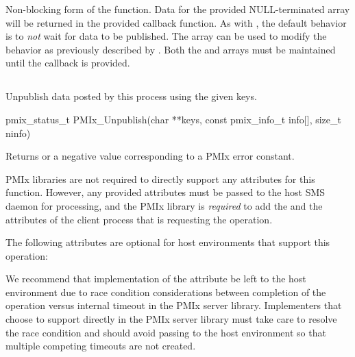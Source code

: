 Non-blocking form of the  function.
Data for the provided NULL-terminated  array will be returned in the provided callback function.
As with , the default behavior is to \emph{not} wait for data to be published.
The  array can be used to modify the behavior as previously described by . Both the  and  arrays must be maintained until the callback is provided.



\subsection{}

\summary

Unpublish data posted by this process using the given keys.

\format

\cspecificstart
\begin{codepar}
pmix_status_t
PMIx_Unpublish(char **keys,
               const pmix_info_t info[], size_t ninfo)
\end{codepar}
\cspecificend

\begin{arglist}
\end{arglist}

Returns  or a negative value corresponding to a PMIx error constant.

\reqattrstart
\ac{PMIx} libraries are not required to directly support any attributes for this function. However, any provided attributes must be passed to the host \ac{SMS} daemon for processing, and the \ac{PMIx} library is \textit{required} to add the  and the  attributes of the client process that is requesting the operation.

\reqattrend

\optattrstart
The following attributes are optional for host environments that support this operation:


\optattrend

\adviceimplstart
We recommend that implementation of the  attribute be left to the host environment due to race condition considerations between completion of the operation versus internal timeout in the \ac{PMIx} server library. Implementers that choose to support  directly in the \ac{PMIx} server library must take care to resolve the race condition and should avoid passing  to the host environment so that multiple competing timeouts are not created.
\adviceimplend


